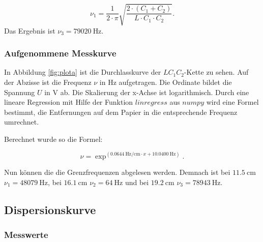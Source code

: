 \begin{equation}
  \nu_1 = \frac{1}{2\cdot\pi}\sqrt{\frac{2 \cdot (C_1+C_2)}{L \cdot C_1 \cdot C_2}}.
\end{equation}
Das Ergebnis ist $\nu_3 = \SI{79020}{\hertz}$.

\subsubsection{Aufgenommene Messkurve}

\begin{figure*}[p]
  \centering
  \caption{Aufgenommene Messkurve.}
  \label{fig:plota}
\end{figure*}

In Abbildung \ref{fig:plota} ist die Durchlasskurve der $LC_1C_2$-Kette zu
sehen. Auf der Abzisse ist die Frequenz $\nu$ in $\si{\hertz}$ aufgetragen. Die
Ordinate bildet die Spannung $U$ in $\si{\volt}$ ab. Die Skalierung der x-Achse
 ist logarithmisch. Durch eine lineare
Regression mit Hilfe der Funktion $linregress$ aus $numpy$ \cite{numpy} wird
eine Formel bestimmt, die Entfernungen auf dem Papier in die entsprechende
Frequenz umrechnet.

Berechnet wurde so die Formel:

\begin{equation}
  \nu = \exp^(\SI{0,0644}{\hertz\per\centi\meter} \cdot x + \SI{10,0400}{\hertz}).
\end{equation}

Nun können die die Grenzfrequenzen abgelesen werden. Demnach ist bei $\SI{11,5}{\centi\meter}$
$\nu_1 = \SI{48079}{\hertz}$, bei $\SI{16,1}{\centi\meter}$ $\nu_2 = \SI{64}{\hertz}$ und
bei $\SI{19,2}{\centi\meter}$ $\nu_3 = \SI{78943}{\hertz}$.

\subsection{Dispersionskurve}

\subsubsection{Messwerte}

